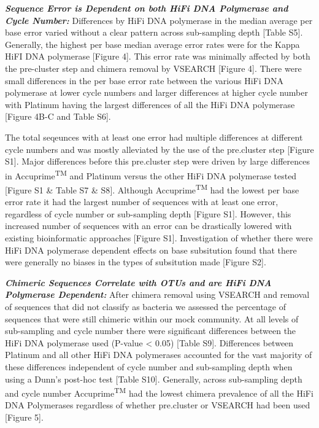 \documentclass[12pt,]{article}
\begin{document}
\textbf{\emph{Sequence Error is Dependent on both HiFi DNA Polymerase
and Cycle Number:}} Differences by HiFi DNA polymerase in the median
average per base error varied without a clear pattern across
sub-sampling depth {[}Table S5{]}. Generally, the highest per base
median average error rates were for the Kappa HiFI DNA polymerase
{[}Figure 4{]}. This error rate was minimally affected by both the
pre-cluster step and chimera removal by VSEARCH {[}Figure 4{]}. There
were small differences in the per base error rate between the various
HiFi DNA polymerase at lower cycle numbers and larger differences at
higher cycle number with Platinum having the largest differences of all
the HiFi DNA polymerase {[}Figure 4B-C and Table S6{]}.

The total seqeunces with at least one error had multiple differences at
different cycle numbers and was mostly alleviated by the use of the
pre.cluster step {[}Figure S1{]}. Major differences before this
pre.cluster step were driven by large differences in
Accuprime\textsuperscript{TM} and Platinum versus the other HiFi DNA
polymerase tested {[}Figure S1 \& Table S7 \& S8{]}. Although
Accuprime\textsuperscript{TM} had the lowest per base error rate it had
the largest number of sequences with at least one error, regardless of
cycle number or sub-sampling depth {[}Figure S1{]}. However, this
increased number of sequences with an error can be drastically lowered
with existing bioinformatic approaches {[}Figure S1{]}. Investigation of
whether there were HiFi DNA polymerase dependent effects on base
subsitution found that there were generally no biases in the types of
subsitution made {[}Figure S2{]}.

\textbf{\emph{Chimeric Sequences Correlate with OTUs and are HiFi DNA
Polymerase Dependent:}} After chimera removal using VSEARCH and removal
of sequences that did not classify as bacteria we assessed the
percentage of sequences that were still chimeric within our mock
community. At all levels of sub-sampling and cycle number there were
significant differences between the HiFi DNA polymerase used (P-value
\textless{} 0.05) {[}Table S9{]}. Differences between Platinum and all
other HiFi DNA polymerases accounted for the vast majority of these
differences independent of cycle number and sub-sampling depth when
using a Dunn's post-hoc test {[}Table S10{]}. Generally, across
sub-sampling depth and cycle number Accuprime\textsuperscript{TM} had
the lowest chimera prevalence of all the HiFi DNA Polymerases regardless
of whether pre.cluster or VSEARCH had been used {[}Figure 5{]}.
\end{document}
